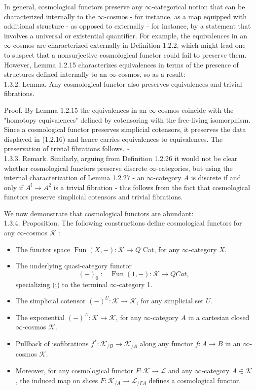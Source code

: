 \documentclass[10pt]{article}
\begin{document}
In general, cosmological functors preserve any $\infty$-categorical notion that can be characterized internally to the $\infty$-cosmos - for instance, as a map equipped with additional structure - as opposed to externally - for instance, by a statement that involves a universal or existential quantifier. For example, the equivalences in an $\infty$-cosmos are characterized externally in Definition 1.2.2, which might lead one to suspect that a nonsurjective cosmological functor could fail to preserve them. However, Lemma 1.2.15 characterizes equivalences in terms of the presence of structures defined internally to an $\infty$-cosmos, so as a result:\\
1.3.2. Lemma. Any cosmological functor also preserves equivalences and trivial fibrations.

Proof. By Lemma 1.2.15 the equivalences in an $\infty$-cosmos coincide with the "homotopy equivalences" defined by cotensoring with the free-living isomorphism. Since a cosmological functor preserves simplicial cotensors, it preserves the data displayed in (1.2.16) and hence carries equivalences to equivalences. The preservation of trivial fibrations follows. \(\square\)\\
1.3.3. Remark. Similarly, arguing from Definition 1.2.26 it would not be clear whether cosmological functors preserve discrete $\infty$-categories, but using the internal characterization of Lemma 1.2.27 - an $\infty$-category $A$ is discrete if and only if $A^{\mathbb{I}} \xrightarrow{ } A^{2}$ is a trivial fibration - this follows from the fact that cosmological functors preserve simplicial cotensors and trivial fibrations.

We now demonstrate that cosmological functors are abundant:\\
1.3.4. Proposition. The following constructions define cosmological functors for any $\infty$-cosmos $\mathcal{K}$ :

\begin{itemize}
  \item[(i)] The functor space $\operatorname{Fun}(X,-): \mathcal{K} \rightarrow Q$ Cat, for any $\infty$-category $X$.
  \item[(ii)] The underlying quasi-category functor
$$
(-)_{0}:=\operatorname{Fun}(1,-): \mathcal{K} \rightarrow Q C a t,
$$
specializing (i) to the terminal $\infty$-category 1.
  \item[(iii)] The simplicial cotensor $(-)^{U}: \mathcal{K} \rightarrow \mathcal{K}$, for any simplicial set $U$.
  \item[(iv)] The exponential $(-)^{A}: \mathcal{K} \rightarrow \mathcal{K}$, for any $\infty$-category $A$ in a cartesian closed $\infty$-cosmos $\mathcal{K}$.
  \item[(v)] Pullback of isofibrations $f^{*}: \mathcal{K}_{/ B} \rightarrow \mathcal{K}_{/ A}$ along any functor $f: A \rightarrow B$ in an $\infty$-cosmos $\mathcal{K}$.
  \item[(vi)] Moreover, for any cosmological functor $F: \mathcal{K} \rightarrow \mathcal{L}$ and any $\infty$-category $A \in \mathcal{K}$, the induced map on slices $F: \mathcal{K}_{/ A} \rightarrow \mathcal{L}_{/ F A}$ defines a cosmological functor.
\end{itemize}
\end{document}
